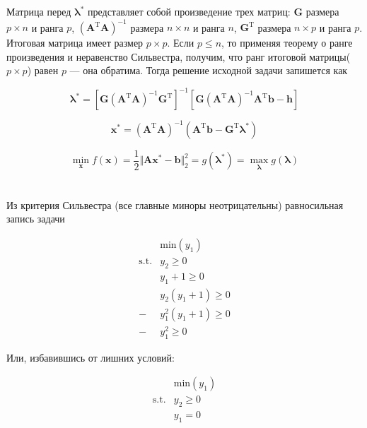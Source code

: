 	Матрица перед $\boldsymbol{\lambda}^{*}$ представляет собой произведение трех матриц: $\mathbf{G}$ размера $p\times n$ и ранга $p$, $(\mathbf{A}^{\text{T}}\mathbf{A})^{-1}$ размера $n\times n$ и ранга $n$, $\mathbf{G}^{\text{T}}$ размера $n\times p$ и ранга $p$. Итоговая матрица имеет размер $p \times p$. Если $p \leqslant n$, то применяя теорему о ранге произведения и неравенство Сильвестра, получим, что ранг итоговой матрицы($p \times p$) равен $p$ --- она обратима. Тогда решение исходной задачи запишется как
	
	\begin{equation}
	\boldsymbol{\lambda}^{*} =\left[ \mathbf{G}(\mathbf{A}^{\text{T}}\mathbf{A})^{-1}\mathbf{G}^{\text{T}}\right] ^{-1} \left[\mathbf{G}(\mathbf{A}^{\text{T}}\mathbf{A})^{-1}\mathbf{A}^{\text{T}}\mathbf{b} - \mathbf{h} \right] 
	\end{equation}
	
	\begin{equation}
	\mathbf{x}^{*} =(\mathbf{A}^{\text{T}}\mathbf{A})^{-1}(\mathbf{A}^{\text{T}}\mathbf{b} -\mathbf{G}^{\text{T}}\boldsymbol{\lambda}^{*})
	\end{equation}
	
	\begin{equation}
	\min_{\mathbf{x}} f(\mathbf{x}) = \frac 12 \Vert \mathbf{A}\mathbf{x}^{*}-\mathbf{b} \Vert_2^2 =  g(\boldsymbol{\lambda}^{*})=\max_{\boldsymbol{\lambda}} g(\boldsymbol{\lambda})
	\end{equation}
	
	\section{}
	
	Из критерия Сильвестра (все главные миноры неотрицательны) равносильная запись задачи
	
	\begin{equation}
	\begin{split}
	&\text{min}( y_1)\\
	\text{s.t.}&y_2 \geqslant 0\\
	&y_1+1 \geqslant 0\\
	&y_2(y_1+1) \geqslant 0\\
	-&y_1^2(y_1+1) \geqslant 0\\
	-&y_1^2 \geqslant 0
	\end{split}
	\end{equation}
	
	Или, избавившись от лишних условий:
	
	\begin{equation}
	\begin{split}
	&\text{min} (y_1)\\
	\text{s.t.}&y_2 \geqslant 0\\
	&y_1 = 0\\
	\end{split}
	\end{equation}
	
	


